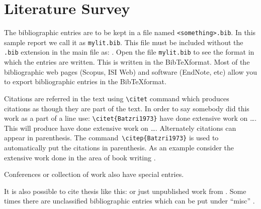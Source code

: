 
\chapter{Literature Survey}

The bibliographic entries are to be kept in a file named
\verb|<something>.bib|. In this sample report we call it as
\verb|mylit.bib|. This file must be included without the \verb|.bib|
extension in the main file as: \verb||.   Open the
file \verb|mylit.bib| to see the format in which the entries are
written. This is written in the Bib\TeX format. Most of the
bibliographic web pages (Scopus, ISI Web) and software (EndNote, etc)
allow you to export bibliographic entries in the Bib\TeX format.

Citations are referred in the text using \verb|\citet| command which produces citations as though they are part of the text.  In order to say
somebody did this work as a part of a line use:
\verb|\citet{Batzri1973}| have done extensive work on \ldots.  This will produce
\citet{Batzri1973} have done extensive work on \ldots. Alternately citations can appear in parenthesis.  
The command~\verb|\citep{Batzri1973}| is used to automatically put the
citations in parenthesis.  As an example consider the extensive work
done in the area of book writing \citep{Sackmann1995a,Boal2012}.

Conferences \citep{rich-mart92} or collection of work
\citep{Sackmann1995a} also have special entries.

It is also possible to cite thesis like this:
\citet{jariwala00,luding94} or just unpublished work from
\citet{SunHI03}. Some times there are unclassified bibliographic
entries which can be put under ``misc'' \citep{Smith99}.




